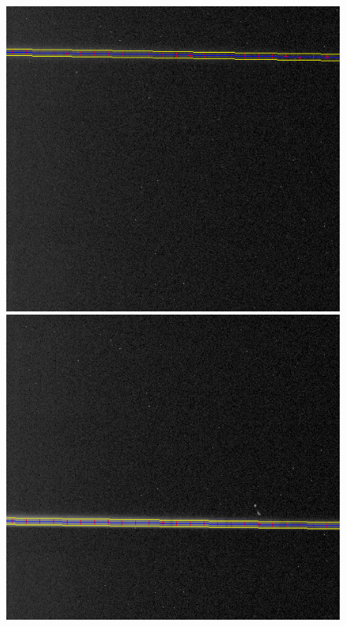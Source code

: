 \begin{figure}[htb]
\begin{center}
\includegraphics[scale=0.25]{plots/trace/point2.png}
\includegraphics[scale=0.25]{plots/trace/point3.png}

\end{center}
\end{figure}
